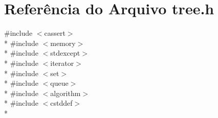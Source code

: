 \section{Referência do Arquivo tree.\+h}
\label{tree_8h}
{\ttfamily \#include $<$cassert$>$}\\*
{\ttfamily \#include $<$memory$>$}\\*
{\ttfamily \#include $<$stdexcept$>$}\\*
{\ttfamily \#include $<$iterator$>$}\\*
{\ttfamily \#include $<$set$>$}\\*
{\ttfamily \#include $<$queue$>$}\\*
{\ttfamily \#include $<$algorithm$>$}\\*
{\ttfamily \#include $<$cstddef$>$}\\*
